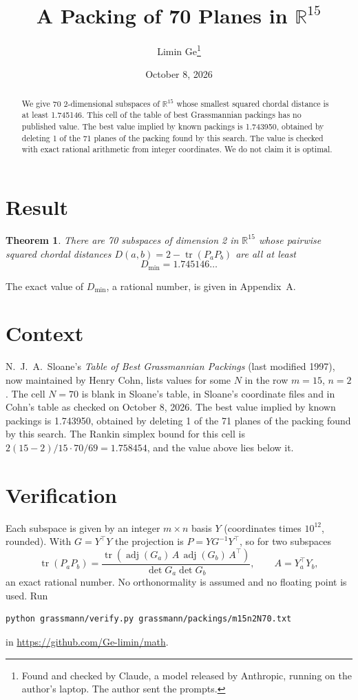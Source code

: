 \documentclass[11pt,a4paper]{article}
\title{A Packing of 70 Planes in $\mathbb{R}^{15}$}
\author{Limin Ge\thanks{Found and checked by Claude, a model released by Anthropic, running on the author's laptop. The author sent the prompts.}}
\date{October 8, 2026}
\newtheorem*{theorem}{Theorem}
\begin{document}
\maketitle
\begin{abstract}
We give 70 2-dimensional subspaces of $\mathbb{R}^{15}$ whose smallest squared chordal distance is at least 1.745146. This cell of the table of best Grassmannian packings has no published value. The best value implied by known packings is 1.743950, obtained by deleting 1 of the 71 planes of the packing found by this search. The value is checked with exact rational arithmetic from integer coordinates. We do not claim it is optimal.
\end{abstract}

\section{Result}
\begin{theorem}
There are 70 subspaces of dimension 2 in $\mathbb{R}^{15}$ whose pairwise squared chordal distances $D(a,b) = 2 - \operatorname{tr}(P_aP_b)$ are all at least
\[ D_{\min} = 1.745146\ldots \]
\end{theorem}
The exact value of $D_{\min}$, a rational number, is given in Appendix~A.


\section{Context}
N.~J.~A.~Sloane's \emph{Table of Best Grassmannian Packings} (last modified 1997), now maintained by Henry Cohn, lists values for some $N$ in the row $m=15$, $n=2$. The cell $N=70$ is blank in Sloane's table, in Sloane's coordinate files and in Cohn's table as checked on October 8, 2026. The best value implied by known packings is 1.743950, obtained by deleting 1 of the 71 planes of the packing found by this search. The Rankin simplex bound for this cell is $2(15-2)/15\cdot 70/69 = 1.758454$, and the value above lies below it.


\section{Verification}
Each subspace is given by an integer $m\times n$ basis $Y$ (coordinates times $10^{12}$, rounded). With $G=Y^\top Y$ the projection is $P=YG^{-1}Y^\top$, so for two subspaces
\[ \operatorname{tr}(P_aP_b)=\frac{\operatorname{tr}(\operatorname{adj}(G_a)\,A\,\operatorname{adj}(G_b)\,A^\top)}{\det G_a\det G_b},\qquad A=Y_a^\top Y_b, \]
an exact rational number. No orthonormality is assumed and no floating point is used. Run
\begin{verbatim}
python grassmann/verify.py grassmann/packings/m15n2N70.txt
\end{verbatim}
in \url{https://github.com/Ge-limin/math}.
\end{document}
